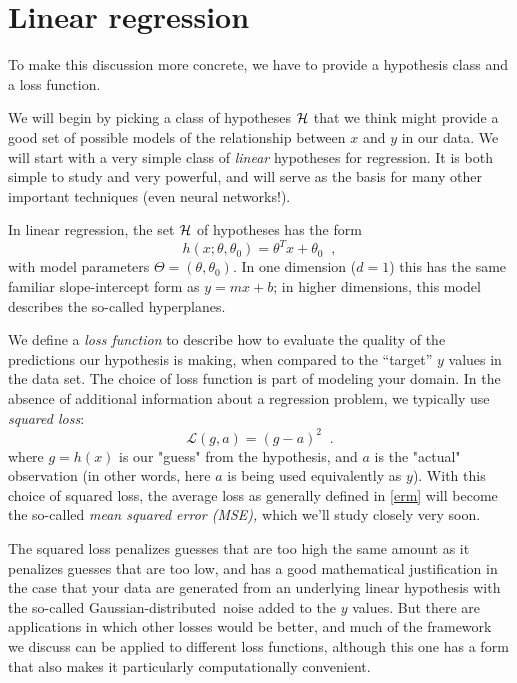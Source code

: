 \section{Linear regression}

To make this discussion more concrete, we have to provide a hypothesis
class and a loss function.

We will begin by picking a class of hypotheses ${\cal H}$ that we think
might provide a good set of possible models of the relationship
between $x$ and $y$ in our data.  We will start with a very simple
class of {\em linear} hypotheses for regression.  It is both simple to
study and very powerful, and will serve as the basis for many other
important techniques (even neural networks!).

In linear regression, the set ${\cal H}$ of hypotheses has the form
\begin{equation}
  h(x;\theta, \theta_0) = \theta^Tx + \theta_0
  \;\;,
  \label{eq:linear_reg_hypothesis}
\end{equation}
%
with model parameters $\Theta = (\theta, \theta_0)$.   In one
dimension ($d = 1$) this has the same familiar slope-intercept form as $y = mx + b$; in higher dimensions, this model describes the so-called hyperplanes.

We define a {\em loss function}
to describe how to evaluate
the quality of the predictions our hypothesis is making, when compared
to the ``target'' $y$ values in the data set.  The choice of loss
function is part of modeling your domain.  In the absence of
additional information about a regression problem, we typically use
  {\em squared loss}:
\[\mathcal{L}(g, a) = (g - a)^2\;\;.\]
where $g=h(x)$ is our "guess" from the hypothesis, and $a$ is the "actual" observation (in other words, here $a$ is being used equivalently as $y$). With this choice of squared loss, the average loss as generally defined in \ref{erm} will become the so-called {\em mean squared error (MSE),} which we'll study closely very soon.

The squared loss penalizes guesses that are too high the
same amount as it penalizes guesses that are too low, and has a good
mathematical justification in the case that your data are generated
from an underlying linear hypothesis with the so-called Gaussian-distributed\
noise added to the $y$ values. But there are applications
in which other losses would be better, and much of the framework we
discuss can be applied to different loss functions, although this one
has a form that also makes it particularly computationally convenient.

